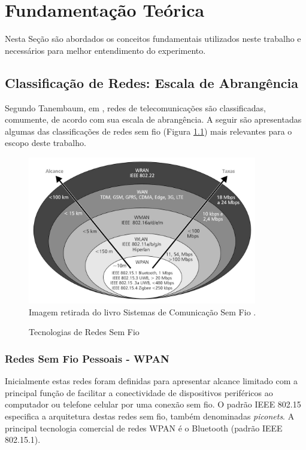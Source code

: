 \chapter{Fundamentação Teórica}
\label{fundamentacao}
Nesta Seção são abordados os conceitos fundamentais utilizados neste trabalho e necessários para melhor entendimento do experimento.

\section{Classificação de Redes: Escala de Abrangência}
\label{classRedes}
Segundo Tanembaum, em \cite{tanembaum2011}, redes de telecomunicações são classificadas, comumente, de acordo com sua escala de abrangência. A seguir são apresentadas algumas das classificações de redes sem fio (Figura \ref{fig:tecnologias_redes_semfiof}) mais relevantes para o escopo deste trabalho.

\begin{figure}[ht]
	\begin{center}
		\caption{Tecnologias de Redes Sem Fio}
		\includegraphics[width=10cm]{./sections/textual/chapters/images/tecnologias_redes_semfio.png}\\
		Imagem retirada do livro Sistemas de Comunicação Sem Fio \cite{rochol2018sistemas}.
		\label{fig:tecnologias_redes_semfiof}
	\end{center}
\end{figure}

\subsection{Redes Sem Fio Pessoais - WPAN}
Inicialmente estas redes foram definidas para apresentar alcance limitado com a principal função de facilitar a conectividade de dispositivos periféricos ao computador ou telefone celular por uma conexão sem fio. O padrão IEEE 802.15 especifica a arquitetura destas redes sem fio, também denominadas \emph{piconets}. A principal  tecnologia comercial de redes WPAN é o Bluetooth (padrão IEEE 802.15.1).

